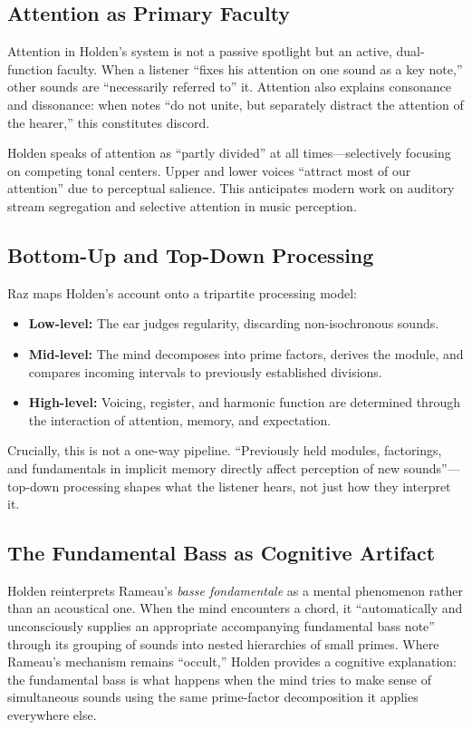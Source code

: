 \documentclass[10pt,letterpaper,twocolumn]{article}
\begin{document}
\subsection{Attention as Primary Faculty}

Attention in Holden's system is not a passive spotlight but an active, dual-function faculty. When a listener ``fixes his attention on one sound as a key note,'' other sounds are ``necessarily referred to'' it. Attention also explains consonance and dissonance: when notes ``do not unite, but separately distract the attention of the hearer,'' this constitutes discord.

Holden speaks of attention as ``partly divided'' at all times---selectively focusing on competing tonal centers. Upper and lower voices ``attract most of our attention'' due to perceptual salience. This anticipates modern work on auditory stream segregation and selective attention in music perception.

\subsection{Bottom-Up and Top-Down Processing}

Raz maps Holden's account onto a tripartite processing model:

\begin{itemize}
\item \textbf{Low-level:} The ear judges regularity, discarding non-isochronous sounds.
\item \textbf{Mid-level:} The mind decomposes into prime factors, derives the module, and compares incoming intervals to previously established divisions.
\item \textbf{High-level:} Voicing, register, and harmonic function are determined through the interaction of attention, memory, and expectation.
\end{itemize}

Crucially, this is not a one-way pipeline. ``Previously held modules, factorings, and fundamentals in implicit memory directly affect perception of new sounds''---top-down processing shapes what the listener hears, not just how they interpret it.

\subsection{The Fundamental Bass as Cognitive Artifact}

Holden reinterprets Rameau's \emph{basse fondamentale} as a mental phenomenon rather than an acoustical one. When the mind encounters a chord, it ``automatically and unconsciously supplies an appropriate accompanying fundamental bass note'' through its grouping of sounds into nested hierarchies of small primes. Where Rameau's mechanism remains ``occult,'' Holden provides a cognitive explanation: the fundamental bass is what happens when the mind tries to make sense of simultaneous sounds using the same prime-factor decomposition it applies everywhere else.
\end{document}
